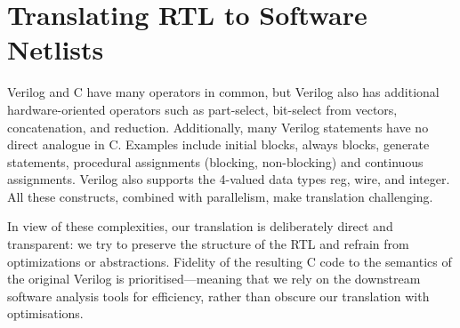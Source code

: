 \section{Translating RTL to Software Netlists}\label{sec:v2c}
%
Verilog and C have many operators in common, but  Verilog also has 
additional hardware-oriented operators such as part-select, bit-select from vectors, concatenation, and reduction. Additionally, many Verilog statements have no direct analogue in C. Examples include
initial blocks, always blocks, generate statements, procedural assignments
(blocking, non-blocking) and continuous assignments. Verilog also supports the 4-valued data types 
reg, wire, and integer.  All these constructs, combined with 
parallelism, make translation challenging.

In view of these complexities, our translation is deliberately direct and transparent: we try to preserve the structure of the RTL and refrain from optimizations or abstractions. Fidelity of the resulting C code to the semantics of the original Verilog is prioritised---meaning that we rely on the downstream software analysis tools for efficiency, rather than obscure our translation with optimisations. 
%
%
